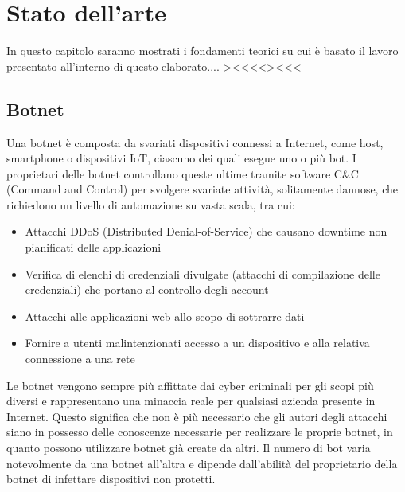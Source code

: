 \chapter{Stato dell'arte}
\label{statodellarte}
In questo capitolo saranno mostrati i fondamenti teorici su cui è basato il lavoro presentato all'interno di questo elaborato.... ><<<<><<<

\section{Botnet}
Una botnet è composta da svariati dispositivi connessi a Internet, come host, smartphone o dispositivi IoT, ciascuno dei quali esegue uno o più bot. I proprietari delle botnet controllano queste ultime tramite software C\&C (Command and Control) per svolgere svariate attività, solitamente dannose, che richiedono un livello di automazione su vasta scala, tra cui:
\begin{itemize}
\item Attacchi DDoS (Distributed Denial-of-Service) che causano downtime non pianificati delle applicazioni
\item Verifica di elenchi di credenziali divulgate (attacchi di compilazione delle credenziali) che portano al controllo degli account
\item Attacchi alle applicazioni web allo scopo di sottrarre dati
\item Fornire a utenti malintenzionati accesso a un dispositivo e alla relativa connessione a una rete
\end{itemize}

Le botnet vengono sempre più affittate dai cyber criminali per gli scopi più diversi e rappresentano una minaccia reale per qualsiasi azienda presente in Internet. Questo significa che non è più necessario che gli autori degli attacchi siano in possesso delle conoscenze necessarie per realizzare le proprie botnet, in quanto possono utilizzare botnet già create da altri. Il numero di bot varia notevolmente da una botnet all'altra e dipende dall'abilità del proprietario della botnet di infettare dispositivi non protetti. 

